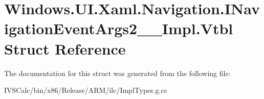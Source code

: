 \hypertarget{struct_windows_1_1_u_i_1_1_xaml_1_1_navigation_1_1_i_navigation_event_args2_____impl_1_1_vtbl}{}\section{Windows.\+U\+I.\+Xaml.\+Navigation.\+I\+Navigation\+Event\+Args2\+\_\+\+\_\+\+Impl.\+Vtbl Struct Reference}
\label{struct_windows_1_1_u_i_1_1_xaml_1_1_navigation_1_1_i_navigation_event_args2_____impl_1_1_vtbl}


The documentation for this struct was generated from the following file\+:\begin{DoxyCompactItemize}
\item 
I\+V\+S\+Calc/bin/x86/\+Release/\+A\+R\+M/ilc/Impl\+Types.\+g.\+cs\end{DoxyCompactItemize}
